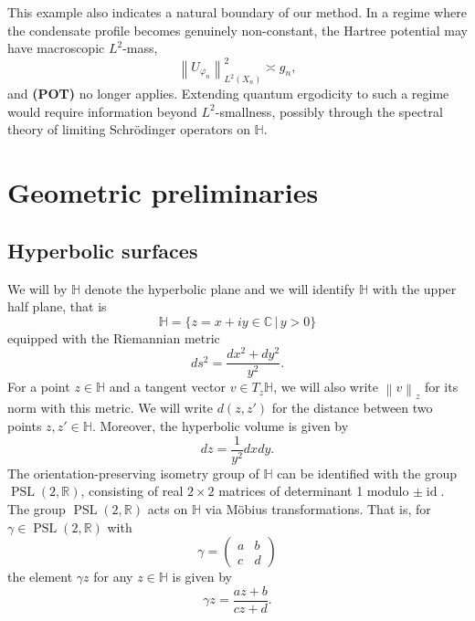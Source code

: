 \documentclass[11pt,twoside,reqno]{amsart}
\newcommand{\R}{\mathbb{R}}
\newcommand{\C}{\mathbb{C}}
\newcommand{\bH}{\mathbb{H}}
\renewcommand{\phi}{\varphi}
\newcommand{\1}{\mathrm{\mathbf{1}}}
\newcommand{\id}{\operatorname{id}}
\DeclareMathOperator{\PSL}{PSL}
\newcommand{\norm}[1]{\left\lVert#1\right\rVert}
\numberwithin{equation}{section}
\theoremstyle{plain}
\theoremstyle{definition}
\theoremstyle{remark}
\begin{document}
This example also indicates a natural boundary of our method. In a regime
where the condensate profile becomes genuinely non-constant, the Hartree
potential may have macroscopic $L^2$-mass,
\[
    \norm{U_{\phi_n}}_{L^2(X_n)}^2\asymp g_n,
\]
and \textbf{(POT)} no longer applies. Extending quantum ergodicity to such a
regime would require information beyond $L^2$-smallness, possibly through the
spectral theory of limiting Schr\"odinger operators on $\mathbb H$.



\section{Geometric preliminaries}\label{SEC:pre}

\subsection{Hyperbolic surfaces}
We will by $\mathbb{H}$ denote the hyperbolic plane and we will identify $\bH$ with the upper half plane, that is
\begin{equation*}
    \bH = \big\{ z=x+iy \in \C \,| \,y>0 \big\}
\end{equation*}
equipped with the Riemannian metric
\begin{equation*}
    ds^2 = \frac{dx^2+dy^2}{y^2}.
\end{equation*}
For a point $z \in \bH$ and a tangent vector $v \in T_z\bH$, we will also write $\norm{v}_z$ for its norm with this metric.
We will write $d(z,z')$ for the distance between two points $z,z'\in \bH$. Moreover, the hyperbolic volume is given by
\begin{equation*}
    dz = \frac{1}{y^2} d x d y.
\end{equation*}
The orientation-preserving isometry group of $\bH$ can be identified with the group $\PSL(2,\R)$, consisting of real $2\times2$ matrices of determinant 1 modulo $\pm \id$. The group $\PSL(2,\R)$ acts on $\bH$ via M\"obius transformations. That is, for $\gamma\in \PSL(2,\R)$ with
\begin{equation}\label{EQ:Pre_gamma_def}
    \gamma=\begin{pmatrix}
        a &b \\ c &d
    \end{pmatrix}
\end{equation}
the element $\gamma z$ for any $z\in \bH$ is given by
\begin{equation*}
    \gamma z = \frac{az +b}{cz +d}.
\end{equation*}
\end{document}
